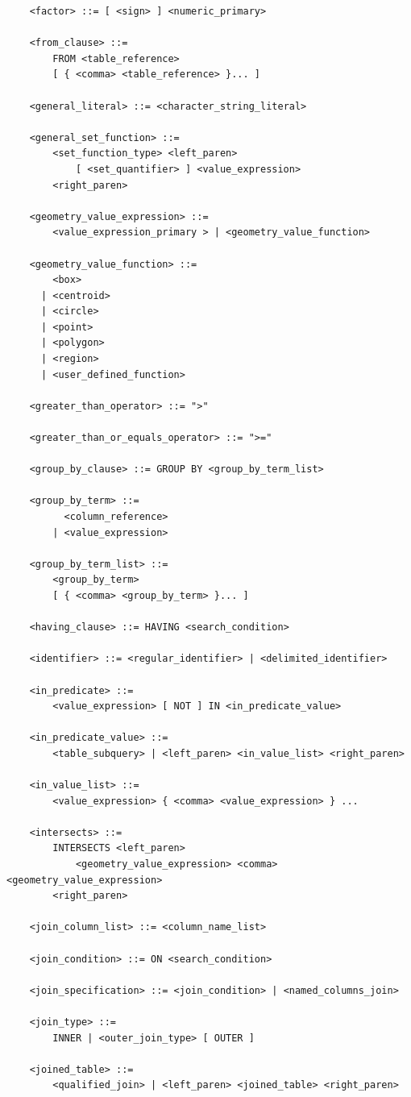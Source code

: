 \documentclass[11pt,a4paper]{ivoa}
\begin{document}
\begin{verbatim}
    <factor> ::= [ <sign> ] <numeric_primary>

    <from_clause> ::=
        FROM <table_reference>
	    [ { <comma> <table_reference> }... ]

    <general_literal> ::= <character_string_literal>

    <general_set_function> ::=
        <set_function_type> <left_paren>
            [ <set_quantifier> ] <value_expression>
        <right_paren>

    <geometry_value_expression> ::=
        <value_expression_primary > | <geometry_value_function>

    <geometry_value_function> ::=
        <box>
      | <centroid>
      | <circle>
      | <point>
      | <polygon>
      | <region>
      | <user_defined_function>

    <greater_than_operator> ::= ">"

    <greater_than_or_equals_operator> ::= ">="

    <group_by_clause> ::= GROUP BY <group_by_term_list>

    <group_by_term> ::=
          <column_reference>
        | <value_expression>

    <group_by_term_list> ::=
        <group_by_term>
        [ { <comma> <group_by_term> }... ]

    <having_clause> ::= HAVING <search_condition>

    <identifier> ::= <regular_identifier> | <delimited_identifier>

    <in_predicate> ::=
        <value_expression> [ NOT ] IN <in_predicate_value>

    <in_predicate_value> ::=
        <table_subquery> | <left_paren> <in_value_list> <right_paren>

    <in_value_list> ::=
        <value_expression> { <comma> <value_expression> } ...

    <intersects> ::=
        INTERSECTS <left_paren>
            <geometry_value_expression> <comma> <geometry_value_expression>
        <right_paren>

    <join_column_list> ::= <column_name_list>

    <join_condition> ::= ON <search_condition>

    <join_specification> ::= <join_condition> | <named_columns_join>

    <join_type> ::=
        INNER | <outer_join_type> [ OUTER ]

    <joined_table> ::=
        <qualified_join> | <left_paren> <joined_table> <right_paren>


\end{verbatim}
\end{document}
